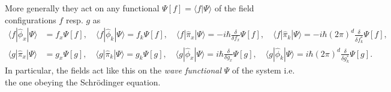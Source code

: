 \documentclass[../QFT_main.tex]{subfiles}
\begin{document}
\begin{mytheorem}
More generally they act on any functional $\Psi[f] = \langle f | \Psi \rangle$ of the field configurations $f$ resp. $g$ as
{\small 
\begin{align}
    \langle f | \hat{\phi}_x | \Psi \rangle &= f_x \Psi[f], \quad \langle f | \hat{\phi}_k | \Psi \rangle = f_k \Psi[f], \quad
    \langle f | \hat{\pi}_x | \Psi \rangle = -i \hbar \frac{\delta}{\delta f_x} \Psi[f], \quad 
    \langle f | \hat{\pi}_k | \Psi \rangle = -i \hbar (2\pi)^d \frac{\delta}{\delta f_k^*} \Psi[f],\\
    \langle g | \hat{\pi}_x | \Psi \rangle &= g_x \Psi[g], \quad \langle g | \hat{\pi}_k | \Psi \rangle = g_k \Psi[g], \quad
    \langle g | \hat{\phi}_x | \Psi \rangle = i \hbar \frac{\delta}{\delta g_x} \Psi[g],\quad \langle g | \hat{\phi}_k | \Psi \rangle = i \hbar (2\pi)^d\frac{\delta}{\delta g_k^*} \Psi[g].
\end{align}
}
In particular, the fields act like this on the \emph{wave functional} $\Psi$ of the system i.e. the one obeying the Schrödinger equation.


\end{mytheorem}
\end{document}
